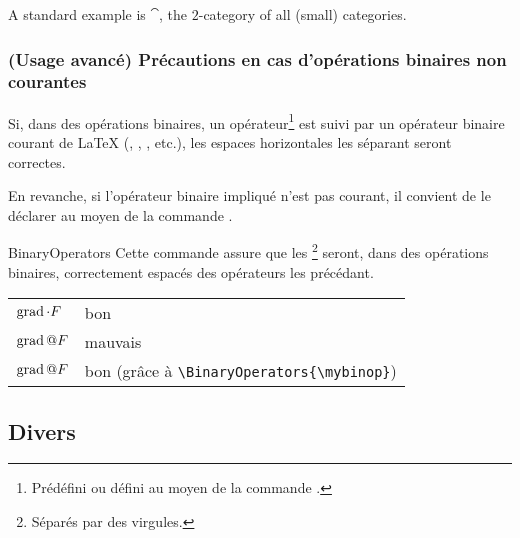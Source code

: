 \begin{preamblecode}
\DeclareMathOperator{\cat}{Cat}
\end{preamblecode}
\begin{bodycode}[listing and text,listing options={deletekeywords={[1]{example}},deletekeywords={[2]{all}}}]
A standard example is $\cat$, the $2$-category of all (small)
categories.
\end{bodycode}

\subsubsection{(Usage avancé) Précautions en cas d'opérations binaires non
  courantes}

Si, dans des opérations binaires, un opérateur\footnote{Prédéfini ou défini au
  moyen de la commande \protect{}.} est suivi par un
opérateur binaire courant de \LaTeX{} (,
, , etc.), les espaces horizontales les
séparant seront correctes.

En revanche, si l'opérateur binaire impliqué n'est pas courant, il convient de
le déclarer au moyen de la commande .

\begin{docCommand}{BinaryOperators}{}
  Cette commande assure que les \footnote{Séparés par
    des virgules.} seront, dans des opérations binaires, correctement espacés
  des opérateurs les précédant.
\end{docCommand}

\begin{preamblecode}
\newcommand{\mybinop}{\mathbin{@}}
\end{preamblecode}
\begin{bodycode}
\begin{tabular}{l@{ : }l}
  $\operatorname{grad} \cdot F$    & bon     \\
  $\grad \mybinop F$ & mauvais \\
  \BinaryOperators{\mybinop}%
  $\grad \mybinop F$ & bon (grâce à \verb|\BinaryOperators{\mybinop}|)
\end{tabular}
\end{bodycode}

\subsection{Divers}

